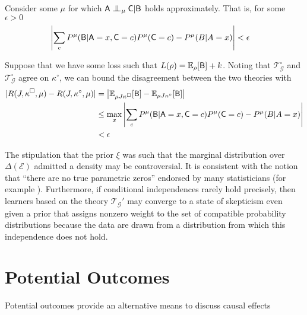 Consider some $\mu$ for which $\RV{A} \CI_\mu \RV{C} | \RV{B}$ holds approximately. That is, for some $\epsilon>0$
\begin{align}
    \left|\sum_c P^\mu(\mathsf{B}|\mathsf{A}=x,\mathsf{C}=c)P^\mu(\mathsf{C}=c)-P^\mu(B|A=x)\right| &< \epsilon \label{eq:app_ci}
\end{align}

Suppose that we have some loss such that $L(\rho)= \mathbb{E}_\rho[\mathsf{B}] + k$. Noting that $\mathscr{T}^\circ_\mathcal{G}$ and $\mathscr{T}^\square_\mathcal{G}$ agree on $\kappa^\circ$, we can bound the disagreement between the two theories with
\begin{align}
    |R(J,\kappa^\square,\mu) - R(J,\kappa^\circ,\mu)| &=  \left|\mathbb{E}_{\mu J \kappa^\square} [\mathsf{B}] - \mathbb{E}_{\mu J \kappa^\circ} [\mathsf{B}]\right|\\
        &\leq \max_x \left|\sum_c P^\mu(\mathsf{B}|\mathsf{A}=x,\mathsf{C}=c)P^\mu(\mathsf{C}=c)-P^\mu(B|A=x) \right|\\
        &< \epsilon
\end{align}

The stipulation that the prior $\xi$ was such that the marginal distribution over $\Delta(\mathcal{E})$ admitted a density may be controversial. It is consistent with the notion that ``there are no true parametric zeros'' endorsed by many statisticians (for example  \cite{gelman_bayesian_2010,meehl_theory-testing_1967,berkson_difficulties_1938}). Furthermore, if conditional independences rarely hold precisely, then learners based on the theory $\mathscr{T}_{\mathcal{G}}'$ may converge to a state of skepticism even given a prior that assigns nonzero weight to the set of compatible probability distributions because the data are drawn from a distribution from which this independence does not hold.

\section{Potential Outcomes}

Potential outcomes provide an alternative means to discuss causal effects 